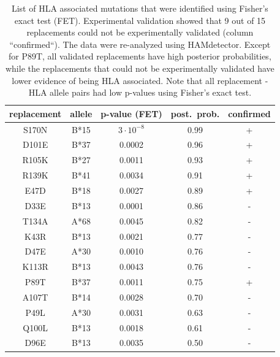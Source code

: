 \documentclass{bioinfo}
\begin{document}
\begin{table}[h!]
  \caption{List of HLA associated mutations that were identified using Fisher's exact test (FET). Experimental validation showed that 9 out of 15 replacements could not be experimentally validated (column “confirmed“). The data were re-analyzed using HAMdetector. Except for P89T, all validated replacements have high posterior probabilities, while the replacements that could not be experimentally validated have lower evidence of being HLA associated. Note that all replacement - HLA allele pairs had low p-values using Fisher's exact test.}
  \vspace{0.5cm}
  \begin{tabular}{c|c|c|c|c}
  replacement & allele  & p-value (FET) & post.~prob. & confirmed \\
  \hline
  S170N       & B*15 & \(3\cdot10^{-8}\)      & 0.99                                & +                        \\
  D101E       & B*37 & 0.0002                        & 0.96                                & +                        \\
  R105K       & B*27 & 0.0011                        & 0.93                                & +                        \\
  R139K       & B*41 & 0.0034                        & 0.91                                & +                        \\
  E47D        & B*18 & 0.0027                        & 0.89                                & +                        \\
  D33E        & B*13 & 0.0001                        & 0.86                                & -                        \\
  T134A       & A*68 & 0.0045                        & 0.82                                & -                        \\
  K43R        & B*13 & 0.0021                        & 0.77                                & -                        \\
  D47E        & A*30 & 0.0010                        & 0.76                                & -                        \\
  K113R       & B*13 & 0.0043                        & 0.76                                & -                        \\
  P89T        & B*37 & 0.0011                        & 0.75                                & +                        \\
  A107T       & B*14 & 0.0028                        & 0.70                                & -                        \\
  P49L        & A*30 & 0.0031                        & 0.63                                & -                        \\
  Q100L       & B*13 & 0.0018                        & 0.61                                & -                        \\
  D96E        & B*13 & 0.0035                        & 0.50                                & -                       
  \end{tabular}
  \label{tab:false-positives}
 \end{table}
\end{document}
